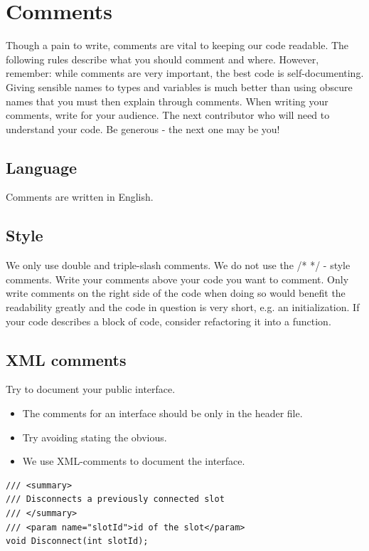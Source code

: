 \documentclass[11pt,a4paper]{article}
\begin{document}
\section{Comments}

Though a pain to write, comments are vital to keeping our code readable. The following rules describe what you should comment and where. However, remember: while comments are very important, the best code is self-documenting. Giving sensible names to types and variables is much better than using obscure names that you must then explain through comments.
When writing your comments, write for your audience. The next contributor who will need to understand your code. Be generous - the next one may be you!

\subsection{Language}

Comments are written in English.

\subsection{Style}

We only use double and triple-slash comments. We do not use the /* */ - style comments.
Write your comments above your code you want to comment. Only write comments on the right side of the code when doing so would benefit the readability greatly and the code in question is very short, e.g. an initialization.
If your code describes a block of code, consider refactoring it into a function.

\subsection{XML comments}

Try to document your public interface. 

\begin{itemize}[itemsep=0pt]
    \item The comments for an interface should be only in the header file.
    \item Try avoiding stating the obvious.
    \item We use XML-comments to document the interface.
\end{itemize}

\begin{lstlisting}[language={[Sharp]C}, caption={Commenting a function}]
/// <summary>
/// Disconnects a previously connected slot
/// </summary>
/// <param name="slotId">id of the slot</param>
void Disconnect(int slotId); 
\end{lstlisting}
\end{document}
